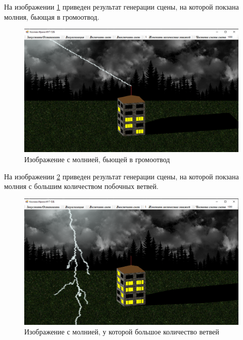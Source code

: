 На изображении \ref{img:t3} приведен результат генерации сцены, на которой покзана молния, бьющая в громоотвод.

\begin{figure}[H]
	\begin{center}
		\includegraphics[scale=0.38]{img/prog_res/t3.png}
	\end{center}
	\captionsetup{justification=centering}
	\caption{Изображение с молнией, бьющей в громоотвод}
	\label{img:t3}
\end{figure}

На изображении \ref{img:t4} приведен результат генерации сцены, на которой покзана молния с большим количеством побочных ветвей.

\begin{figure}[H]
	\begin{center}
		\includegraphics[scale=0.38]{img/prog_res/t4.png}
	\end{center}
	\captionsetup{justification=centering}
	\caption{Изображение с молнией, у которой большое количество ветвей}
	\label{img:t4}
\end{figure}

